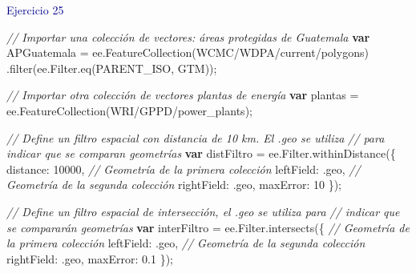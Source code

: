 \documentclass[
  12pt,
  letterpaper,
  twoside]{book}
\newenvironment{Shaded}{\begin{snugshade}}{\end{snugshade}}
\newcommand{\AttributeTok}[1]{\textcolor[rgb]{0.48,0.12,0.64}{#1}}
\newcommand{\CommentTok}[1]{\textcolor[rgb]{0.24,0.58,0.00}{\textit{#1}}}
\newcommand{\ControlFlowTok}[1]{\textcolor[rgb]{0.00,0.00,0.00}{\textbf{#1}}}
\newcommand{\DataTypeTok}[1]{\textcolor[rgb]{0.00,0.00,0.00}{#1}}
\newcommand{\DecValTok}[1]{\textcolor[rgb]{0.28,0.53,0.93}{#1}}
\newcommand{\FloatTok}[1]{\textcolor[rgb]{0.28,0.53,0.93}{#1}}
\newcommand{\FunctionTok}[1]{\textcolor[rgb]{0.48,0.12,0.64}{#1}}
\newcommand{\KeywordTok}[1]{\textcolor[rgb]{0.48,0.12,0.64}{#1}}
\newcommand{\NormalTok}[1]{#1}
\newcommand{\OperatorTok}[1]{\textcolor[rgb]{0.00,0.00,0.00}{#1}}
\newcommand{\StringTok}[1]{\textcolor[rgb]{0.87,0.29,0.22}{#1}}
\begin{document}
\textcolor{darkblue}{Ejercicio 25}

\begin{Shaded}
\begin{Highlighting}[]
\CommentTok{// Importar una colección de vectores: áreas protegidas de Guatemala}
\ControlFlowTok{var}\NormalTok{ APGuatemala }\OperatorTok{=} \KeywordTok{ee}\OperatorTok{.}\FunctionTok{FeatureCollection}\NormalTok{(}\StringTok{\textquotesingle{}WCMC/WDPA/current/polygons\textquotesingle{}}\NormalTok{)}
  \OperatorTok{.}\FunctionTok{filter}\NormalTok{(}\KeywordTok{ee}\OperatorTok{.}\AttributeTok{Filter}\OperatorTok{.}\FunctionTok{eq}\NormalTok{(}\StringTok{\textquotesingle{}PARENT\_ISO\textquotesingle{}}\OperatorTok{,} \StringTok{\textquotesingle{}GTM\textquotesingle{}}\NormalTok{))}\OperatorTok{;}

\CommentTok{// Importar otra colección de vectores plantas de energía}
\ControlFlowTok{var}\NormalTok{ plantas }\OperatorTok{=} \KeywordTok{ee}\OperatorTok{.}\FunctionTok{FeatureCollection}\NormalTok{(}\StringTok{\textquotesingle{}WRI/GPPD/power\_plants\textquotesingle{}}\NormalTok{)}\OperatorTok{;}

\CommentTok{// Define un filtro espacial con distancia de 10 km. El .geo se utiliza }
\CommentTok{// para indicar que se comparan geometrías}
\ControlFlowTok{var}\NormalTok{ distFiltro }\OperatorTok{=} \KeywordTok{ee}\OperatorTok{.}\AttributeTok{Filter}\OperatorTok{.}\FunctionTok{withinDistance}\NormalTok{(\{}
  \DataTypeTok{distance}\OperatorTok{:} \DecValTok{10000}\OperatorTok{,}
  \CommentTok{// Geometría de la primera colección}
  \DataTypeTok{leftField}\OperatorTok{:} \StringTok{\textquotesingle{}.geo\textquotesingle{}}\OperatorTok{,} 
  \CommentTok{// Geometría de la segunda colección}
  \DataTypeTok{rightField}\OperatorTok{:} \StringTok{\textquotesingle{}.geo\textquotesingle{}}\OperatorTok{,} 
  \DataTypeTok{maxError}\OperatorTok{:} \DecValTok{10}
\NormalTok{\})}\OperatorTok{;}

\CommentTok{// Define un filtro espacial de intersección, el .geo se utiliza para }
\CommentTok{// indicar que se compararán geometrías}
\ControlFlowTok{var}\NormalTok{ interFiltro }\OperatorTok{=} \KeywordTok{ee}\OperatorTok{.}\AttributeTok{Filter}\OperatorTok{.}\FunctionTok{intersects}\NormalTok{(\{}
  \CommentTok{// Geometría de la primera colección}
  \DataTypeTok{leftField}\OperatorTok{:} \StringTok{\textquotesingle{}.geo\textquotesingle{}}\OperatorTok{,} 
  \CommentTok{// Geometría de la segunda colección}
  \DataTypeTok{rightField}\OperatorTok{:} \StringTok{\textquotesingle{}.geo\textquotesingle{}}\OperatorTok{,} 
  \DataTypeTok{maxError}\OperatorTok{:} \FloatTok{0.1}
\NormalTok{\})}\OperatorTok{;}


\end{Highlighting}
\end{Shaded}
\end{document}
